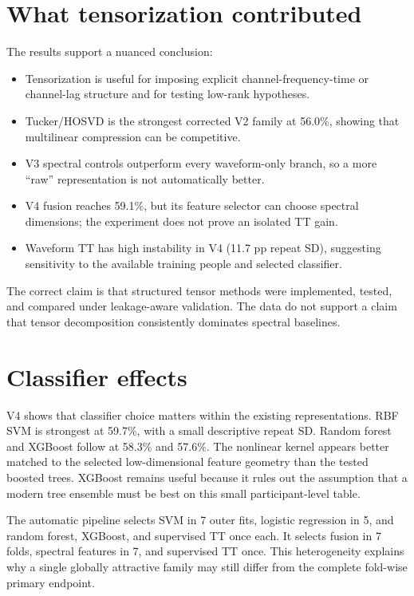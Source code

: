 \section{What tensorization contributed}

The results support a nuanced conclusion:

\begin{itemize}
  \item Tensorization is useful for imposing explicit channel-frequency-time or
  channel-lag structure and for testing low-rank hypotheses.
  \item Tucker/HOSVD is the strongest corrected V2 family at 56.0\%, showing that
  multilinear compression can be competitive.
  \item V3 spectral controls outperform every waveform-only branch, so a more
  ``raw'' representation is not automatically better.
  \item V4 fusion reaches 59.1\%, but its feature selector can choose spectral
  dimensions; the experiment does not prove an isolated TT gain.
  \item Waveform TT has high instability in V4 (11.7 pp repeat SD), suggesting
  sensitivity to the available training people and selected classifier.
\end{itemize}

The correct claim is that structured tensor methods were implemented, tested,
and compared under leakage-aware validation. The data do not support a claim
that tensor decomposition consistently dominates spectral baselines.

\section{Classifier effects}

V4 shows that classifier choice matters within the existing representations.
RBF SVM is strongest at 59.7\%, with a small descriptive repeat SD. Random forest
and XGBoost follow at 58.3\% and 57.6\%. The nonlinear kernel appears better
matched to the selected low-dimensional feature geometry than the tested boosted
trees. XGBoost remains useful because it rules out the assumption that a modern
tree ensemble must be best on this small participant-level table.

The automatic pipeline selects SVM in 7 outer fits, logistic regression in 5,
and random forest, XGBoost, and supervised TT once each. It selects fusion in 7
folds, spectral features in 7, and supervised TT once. This heterogeneity
explains why a single globally attractive family may still differ from the
complete fold-wise primary endpoint.

